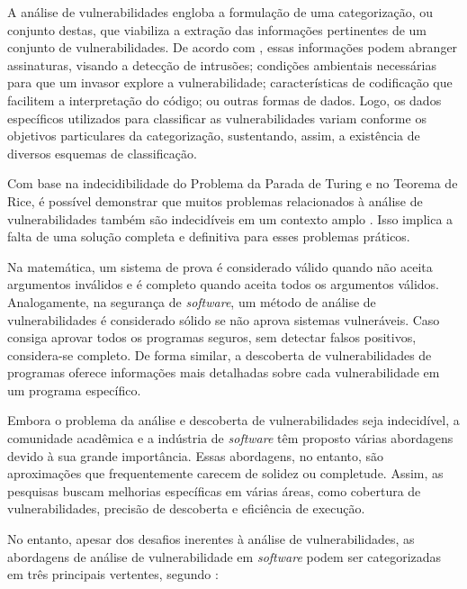         A análise de vulnerabilidades engloba a formulação de uma categorização, ou conjunto destas, que viabiliza a extração das informações pertinentes de um conjunto de vulnerabilidades. De acordo com , essas informações podem abranger assinaturas, visando a detecção de intrusões; condições ambientais necessárias para que um invasor explore a vulnerabilidade; características de codificação que facilitem a interpretação do código; ou outras formas de dados. Logo, os dados específicos utilizados para classificar as vulnerabilidades variam conforme os objetivos particulares da categorização, sustentando, assim, a existência de diversos esquemas de classificação.

        Com base na indecidibilidade do Problema da Parada de Turing e no Teorema de Rice, é possível demonstrar que muitos problemas relacionados à análise de vulnerabilidades também são indecidíveis em um contexto amplo \cite{ghaffarian2017}. Isso implica a falta de uma solução completa e definitiva para esses problemas práticos.

        Na matemática, um sistema de prova é considerado válido quando não aceita argumentos inválidos e é completo quando aceita todos os argumentos válidos. Analogamente, na segurança de \textit{software}, um método de análise de vulnerabilidades é considerado sólido se não aprova sistemas vulneráveis. Caso consiga aprovar todos os programas seguros, sem detectar falsos positivos, considera-se completo. De forma similar, a descoberta de vulnerabilidades de programas oferece informações mais detalhadas sobre cada vulnerabilidade em um programa específico.

        Embora o problema da análise e descoberta de vulnerabilidades seja indecidível, a comunidade acadêmica e a indústria de \textit{software} têm proposto várias abordagens devido à sua grande importância. Essas abordagens, no entanto, são aproximações que frequentemente carecem de solidez ou completude. Assim, as pesquisas buscam melhorias específicas em várias áreas, como cobertura de vulnerabilidades, precisão de descoberta e eficiência de execução.

        No entanto, apesar dos desafios inerentes à análise de vulnerabilidades, as abordagens de análise de vulnerabilidade em \textit{software} podem ser categorizadas em três principais vertentes, segundo :

